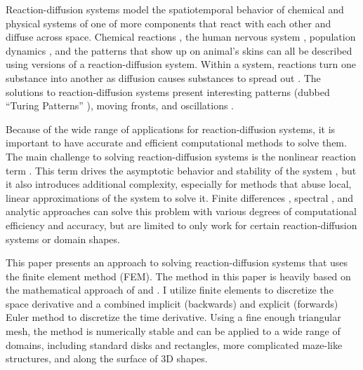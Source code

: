 Reaction-diffusion systems model the spatiotemporal behavior of chemical and physical systems of one of more components that react with each other and diffuse across space. Chemical reactions \parencites{zhabotinsky2007belousov}{graham1993temperature}, the human nervous system \parencite{fitzhugh1961impulses}, population dynamics \parencite{clair2024reaction}, and the patterns that show up on animal's skins \parencites{turing1990chemical}{de2020leopard} can all be described using versions of a reaction-diffusion system. Within a system, reactions turn one substance into another as diffusion causes substances to spread out \parencite{li2020reaction}. The solutions to reaction-diffusion systems present interesting patterns (dubbed ``Turing Patterns'' \parencite{vittadello2021turing}), moving fronts, and oscillations \parencites{szalai2004turing}{rinzel1982propagation}{turing1990chemical}.

Because of the wide range of applications for reaction-diffusion systems, it is important to have accurate and efficient computational methods to solve them. The main challenge to solving reaction-diffusion systems is the nonlinear reaction term \parencites{pao1982nonlinear}{martin1992nonlinear}. This term drives the asymptotic behavior and stability of the system \parencite{pao1982nonlinear}, but it also introduces additional complexity, especially for methods that abuse local, linear approximations of the system to solve it. Finite differences \parencite{hoff1978stability}, spectral \parencites{bueno2014fourier}{craster2018spectral}, and analytic \parencites{spendier2013analytic} approaches can solve this problem with various degrees of computational efficiency and accuracy, but are limited to only work for certain reaction-diffusion systems or domain shapes.

This paper presents an approach to solving reaction-diffusion systems that uses the finite element method (FEM). The method in this paper is heavily based on the mathematical approach of \textcite{sellami2020accelerating} and \textcite{lang1992finite}. I utilize finite elements to discretize the space derivative and a combined implicit (backwards) and explicit (forwards) Euler method to discretize the time derivative. Using a fine enough triangular mesh, the method is numerically stable and can be applied to a wide range of domains, including standard disks and rectangles, more complicated maze-like structures, and along the surface of 3D shapes.
